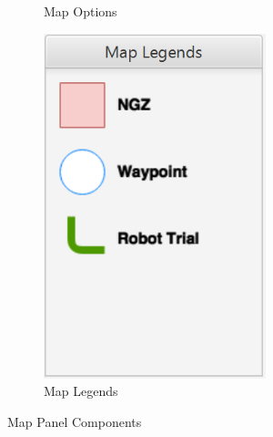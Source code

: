 \begin{figure}[H]
\begin{subfigure}[t]{0.25\textwidth}
		\caption{Map Options}
		\label{fig:Map Options}                
	\end{subfigure}
	\begin{subfigure}[t]{0.25\textwidth}
		\includegraphics[width=0.95\linewidth]{maplegends.png}  
		\caption{Map Legends}
		\label{fig:Map Legends}                
	\end{subfigure}
	\caption{Map Panel Components}
\end{figure}

